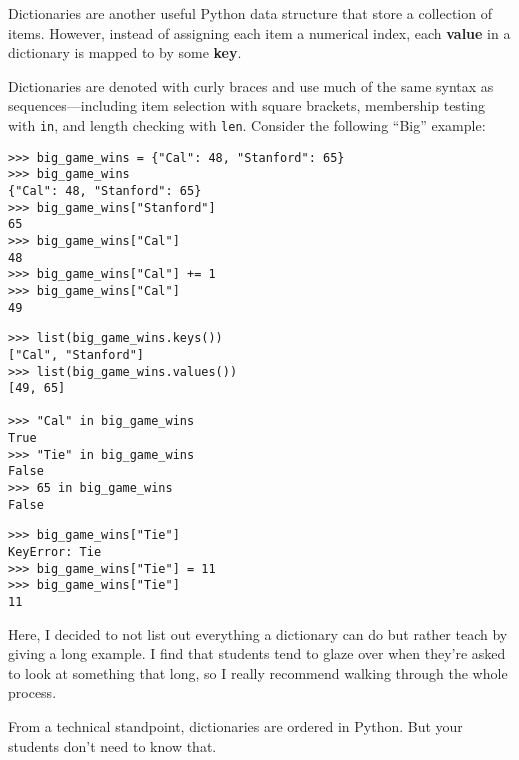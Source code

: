 \begin{blocksection}
Dictionaries are another useful Python data structure that store a collection of items. However, instead of assigning each item a numerical index, each \textbf{value} in a dictionary is mapped to by some \textbf{key}. 

Dictionaries are denoted with curly braces and use much of the same syntax as sequences---including item selection with square brackets, membership testing with \lstinline{in}, and length checking with \lstinline{len}. Consider the following ``Big'' example:
\begin{lstlisting}
>>> big_game_wins = {"Cal": 48, "Stanford": 65}
>>> big_game_wins 
{"Cal": 48, "Stanford": 65}
>>> big_game_wins["Stanford"]
65
>>> big_game_wins["Cal"]
48
>>> big_game_wins["Cal"] += 1
>>> big_game_wins["Cal"]
49
\end{lstlisting}
\end{blocksection}

\begin{blocksection}
\begin{lstlisting}
>>> list(big_game_wins.keys())
["Cal", "Stanford"]
>>> list(big_game_wins.values())
[49, 65]

>>> "Cal" in big_game_wins
True
>>> "Tie" in big_game_wins
False
>>> 65 in big_game_wins
False
\end{lstlisting}
\end{blocksection}

\begin{blocksection}
\begin{lstlisting}
>>> big_game_wins["Tie"]
KeyError: Tie
>>> big_game_wins["Tie"] = 11
>>> big_game_wins["Tie"]
11
\end{lstlisting}
\end{blocksection}

\begin{meta}
Here, I decided to not list out everything a dictionary can do but rather teach by giving a long example. I find that students tend to glaze over when they're asked to look at something that long, so I really recommend walking through the whole process. 

From a technical standpoint, dictionaries are ordered in Python. But your students don't need to know that.
\end{meta}